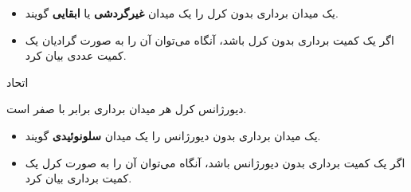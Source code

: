 \begin{ELunit}

\begin{itemize}
\tightlist
\item
  یک میدان برداری بدون کرل را یک میدان \textbf{غیرگردشی} یا \textbf{ابقایی} گویند.
\item
  اگر یک کمیت برداری بدون کرل باشد، آنگاه می‌توان آن را به صورت گرادیان یک کمیت عددی بیان کرد.
\end{itemize}

\end{ELunit}

\begin{ELimportant}{اتحاد }

دیورژانس کرل هر میدان برداری برابر با صفر است.

\end{ELimportant}

\begin{ELunit}

\begin{itemize}
\tightlist
\item
  یک میدان برداری بدون دیورژانس را یک میدان \textbf{سلونوئیدی} گویند.
\item
  اگر یک کمیت برداری بدون دیورژانس باشد، آنگاه می‌توان آن را به صورت کرل یک کمیت برداری بیان کرد.
\end{itemize}

\end{ELunit}
